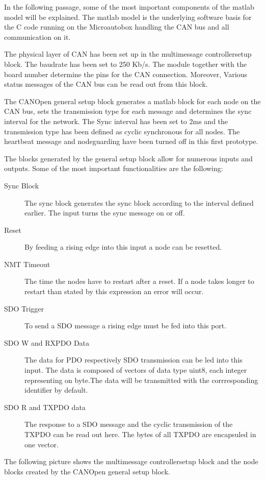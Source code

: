 In the following passage, some of the most important components of the matlab model will be explained. The matlab model is the underlying software basis for the C code running on the Microautobox handling the CAN bus and all communication on it.

The physical layer of CAN has been set up in the multimessage controllersetup block. The baudrate has been set to 250 Kb/s. The module together with the board number determine the pins for the CAN connection. Moreover, Various status messages of the CAN bus can be read out from this block.

The CANOpen general setup block generates a matlab block for each node on the CAN bus, sets the transmission type for each message and determines the sync interval for the network. The Sync interval has been set to 2ms and the transmission type has been defined as cyclic synchronous for all nodes. The heartbeat message and nodeguarding have been turned off in this first prototype.

The blocks generated by the general setup block allow for numerous inputs and outputs. Some of the most important functionalities are the following:

\begin{description}
	\item[Sync Block]
	The sync block generates the sync block according to the interval defined earlier. The input turns the sync message on or off.
	\item[Reset] 
	By feeding a rising edge into this input a node can be resetted. 
	\item[NMT Timeout]
	The time the nodes have to restart after a reset. If a node takes longer to restart than stated by this expression an error will occur.
	\item[SDO Trigger]
	To send a SDO message a rising edge must be fed into this port.  
	\item[SDO W and RXPDO Data] 
	The data for PDO respectively SDO transmission can be led into this input. The data is composed of vectors of data type uint8, each integer representing on byte.The data will be transmitted with the corrresponding identifier by default.
	\item[SDO R and TXPDO data] 
	The response to a SDO message and the cyclic transmission of the TXPDO can be read out here. The bytes of all TXPDO are encapsuled in one vector.
	
\end{description}

The following picture shows the multimessage controllersetup block and the node blocks created by the CANOpen general setup block.

